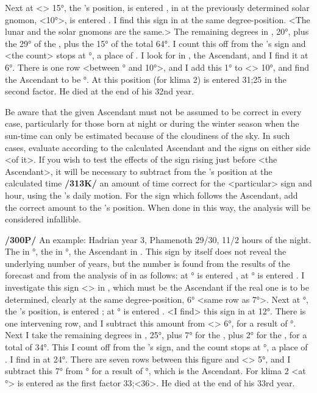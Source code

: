Next at <\Scorpio> 15°, the \Moon’s position, is entered
\Virgo, in \Virgo\xspace at the previously determined solar gnomon, <10°>, is entered \Libra. I find this sign in \Aquarius\xspace at the same degree-position. <The lunar and the solar gnomons are the same.> The remaining degrees in \Aquarius, 20°, plus the 29° of the \Sun, plus the 15° of the \Moon total 64°. I count this off from
the \Moon’s sign and <the count> stops at \Capricorn\xspace 4°, a place of \Virgo. I look for \Virgo\xspace in \Aquarius, the Ascendant, and I find it at 6°. There is one row <between \Aquarius\xspace 6° and 10°>, and I add this 1° to <\Aquarius> 10°, and find the Ascendant to be \Aquarius\xspace 11°. At this position (for klima 2) is entered 31;25 in the second factor. He died at the end of his 32nd year.

Be aware that the given Ascendant must not be assumed to be correct in every case, particularly for those born at night or during the winter season when the sun-time can only be estimated because of the cloudiness of the sky. In such cases, evaluate according to the calculated Ascendant and the signs on either side <of it>. If you wish to test the effects of the sign rising just before <the Ascendant>, it will be necessary to subtract from the \Moon’s position at the calculated time \textbf{/313K/} an amount of time correct for the <particular> sign and hour, using the \Moon’s daily motion. For the sign which follows the Ascendant, add the correct amount to the \Moon’s position. When done in this way, the analysis will be considered infallible.

\textbf{/300P/} An example: Hadrian year 3, Phamenoth 29/30, 11/2 hours of the night. The \Sun\xspace in \Aries\xspace 7°, the \Moon\xspace in °, the Ascendant in \Scorpio. This sign by itself does not reveal the underlying number of years, but the number is found from the results of the forecast and from the analysis of \Sagittarius\xspace in \Scorpio\xspace as follows: at \Aries\xspace 7° is entered \Sagittarius, at \Sagittarius\xspace 7° is entered \Cancer. I investigate this sign <\Cancer> in \Sagittarius, which must be the Ascendant if the real one is to be determined, clearly at the same degree-position, 6° <same row as 7°>. Next at \Pisces\xspace 2°, the \Moon’s position, is entered \Pisces; at \Pisces\xspace 6° is entered \Taurus. <I find> this sign in \Sagittarius at 12°. There is one intervening row, and I subtract this amount from <\Sagittarius> 6°, for a result of \Sagittarius\xspace 5°. Next I take the remaining degrees in \Sagittarius, 25°, plus 7° for the \Sun, plus 2° for the \Moon, for a total of 34°. This I count off from the \Moon’s sign, and the count stops at \Aries\xspace 4°, a place of \Capricorn. I find \Capricorn\xspace in \Sagittarius\xspace at 24°. There are seven rows between this figure and <\Sagittarius> 5°, and I subtract this 7° from \Sagittarius\xspace 5° for a result of \Scorpio\xspace 28°, which is the Ascendant. For klima 2 <at \Scorpio\xspace 28°> is entered as the first factor 33;<36>. He died at the end of his 33rd year.

